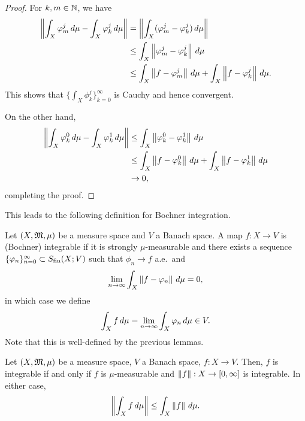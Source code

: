 \documentclass[a4paper]{article}
\renewcommand{\seqinfn}[1]{\{ #1 \}_{n=0}^\infty}
\renewcommand{\seqinfk}[1]{\{ #1 \}_{k=0}^\infty}
\begin{document}
\begin{proof}
  For $k, m \in \mathbb{N}$, we have
  \[
    \begin{aligned}
      \left\lVert \int_X \varphi_m^j \, d\mu - \int_X \varphi_k^j \, d \mu\right\rVert
       & = \left\lVert \int_X (\varphi_m^j - \varphi_k^j) \, d \mu\right\rVert  \\
       & \leq \int_X \left\lVert \varphi_m^j - \varphi_k^j\right\rVert \, d \mu \\
       & \leq \int_X \left\lVert f - \varphi_m^j\right\rVert \, d \mu
      + \int_X \left\lVert f - \varphi_k^j\right\rVert \, d \mu.
    \end{aligned}
  \]
  This shows that $\seqinfk{\int_X \phi_k^j}$ is Cauchy and hence
  convergent.

  On the other hand,
  \[
    \begin{aligned}
      \left\lVert \int_X \varphi_k^0 \, d \mu - \int_X \varphi_k^1 \, d \mu\right\rVert
       & \leq \int_X \left\lVert \varphi_k^0 - \varphi_k^1\right\rVert \, d \mu \\
       & \leq \int_X \left\lVert f - \varphi_k^0\right\rVert \, d \mu
      + \int_X \left\lVert f - \varphi_k^1\right\rVert \, d \mu              \\
       & \to 0,
    \end{aligned}
  \]
  completing the proof.
\end{proof}

This leads to the following definition for Bochner integration.

\begin{defi}
  Let $(X, \mathfrak{M}, \mu)$ be a measure space and $V$ a Banach space. A map $f
    : X \to V$ is (Bochner) integrable if it is strongly $\mu$-measurable
  and there exists a sequence $\seqinfn{\phi_n} \subset \Sfin(X; V)$ such
  that $\phi_n \to f$ a.e.\ and
  \[
    \lim_{n \to \infty} \int_X \left\lVert f - \varphi_n\right\rVert \, d \mu = 0,
  \]
  in which case we define
  \[
    \int_X f \, d \mu = \lim_{n \to \infty} \int_X \varphi_n \, d \mu \in V.
  \]
  Note that this is well-defined by the previous lemmas.
\end{defi}

\begin{thm}
  Let $(X, \mathfrak{M}, \mu)$ be a measure space, $V$ a Banach space,
  $f : X \to V$. Then,
  $f$ is integrable if and only if $f$ is $\mu$-measurable
  and $\left\lVert f\right\rVert : X \to [0, \infty]$ is integrable.
  In either case,
  \[
    \left\lVert \int_X f \, d \mu\right\rVert \leq \int_X \left\lVert f\right\rVert \, d \mu.
  \]
\end{thm}
\end{document}
